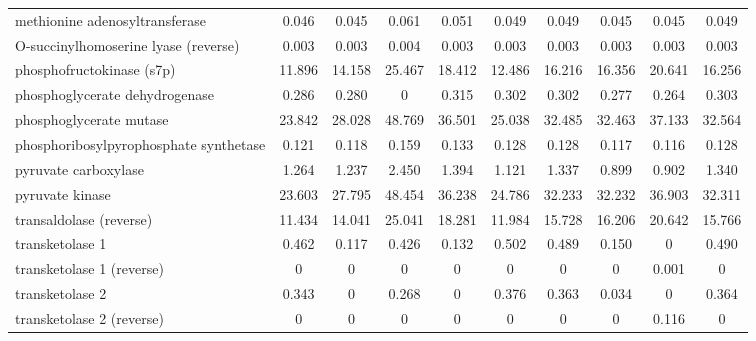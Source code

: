 \begin{table}[H]
{\begin{tabular}{lccccccccc}
methionine adenosyltransferase         & 0.046  & 0.045  & 0.061  & 0.051  & 0.049  & 0.049  & 0.045  & 0.045  & 0.049  \\
O-succinylhomoserine lyase (reverse)   & 0.003  & 0.003  & 0.004  & 0.003  & 0.003  & 0.003  & 0.003  & 0.003  & 0.003  \\
phosphofructokinase (s7p)              & 11.896 & 14.158 & 25.467 & 18.412 & 12.486 & 16.216 & 16.356 & 20.641 & 16.256 \\
phosphoglycerate dehydrogenase         & 0.286  & 0.280  & 0      & 0.315  & 0.302  & 0.302  & 0.277  & 0.264  & 0.303  \\
phosphoglycerate mutase                & 23.842 & 28.028 & 48.769 & 36.501 & 25.038 & 32.485 & 32.463 & 37.133 & 32.564 \\
phosphoribosylpyrophosphate synthetase & 0.121  & 0.118  & 0.159  & 0.133  & 0.128  & 0.128  & 0.117  & 0.116  & 0.128  \\
pyruvate carboxylase                   & 1.264  & 1.237  & 2.450  & 1.394  & 1.121  & 1.337  & 0.899  & 0.902  & 1.340  \\
pyruvate kinase                        & 23.603 & 27.795 & 48.454 & 36.238 & 24.786 & 32.233 & 32.232 & 36.903 & 32.311 \\
transaldolase (reverse)                & 11.434 & 14.041 & 25.041 & 18.281 & 11.984 & 15.728 & 16.206 & 20.642 & 15.766 \\
transketolase 1                        & 0.462  & 0.117  & 0.426  & 0.132  & 0.502  & 0.489  & 0.150  & 0      & 0.490  \\
transketolase 1 (reverse)              & 0      & 0      & 0      & 0      & 0      & 0      & 0      & 0.001  & 0      \\
transketolase 2                        & 0.343  & 0      & 0.268  & 0      & 0.376  & 0.363  & 0.034  & 0      & 0.364  \\
transketolase 2 (reverse)              & 0      & 0      & 0      & 0      & 0      & 0      & 0      & 0.116  & 0 \\ \hline
\end{tabular}}
\end{table}
